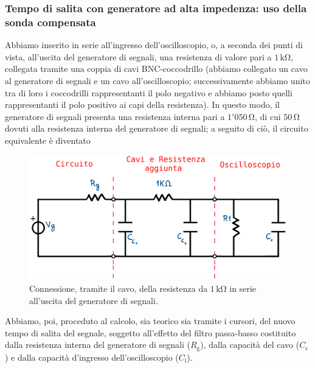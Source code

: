 \documentclass{article}
\begin{document}
			\subsubsection{Tempo di salita con generatore ad alta impedenza: uso della sonda compensata}
				Abbiamo inserito in serie all'ingresso dell'oscilloscopio, o, a seconda dei punti di vista, all'uscita del generatore di segnali, una resistenza di valore pari a $ 1 \, \mathrm{k\Omega} $, collegata tramite una coppia di cavi BNC-coccodrillo (abbiamo collegato un cavo al generatore di segnali e un cavo all'oscilloscopio; successivamente abbiamo unito tra di loro i coccodrilli rappresentanti il polo negativo e abbiamo posto quelli rappresentanti il polo positivo ai capi della resistenza). In questo modo, il generatore di segnali presenta una resistenza interna pari a $ 1'050 \, \mathrm{\Omega} $, di cui $ 50 \, \mathrm{\Omega} $ dovuti alla resistenza interna del generatore di segnali; a seguito di ciò, il circuito equivalente è diventato
				\begin{figure}[h!]
					\centering
					\includegraphics[scale=0.5]{circuitoResistenzaSerieCavo}
					\caption{Connessione, tramite il cavo, della resistenza da $ 1 \, \mathrm{k\Omega} $ in serie all'uscita del generatore di segnali.}
					\label{fig:circuitoResistenzaSerieCavo}
				\end{figure}
				\newpage
				Abbiamo, poi, proceduto al calcolo, sia teorico sia tramite i cursori, del nuovo tempo di salita del segnale, soggetto all'effetto del filtro passa-basso costituito dalla resistenza interna del generatore di segnali ($ R_{\mathrm{g}} $), dalla capacità del cavo ($ C_{\mathrm{c}} $) e dalla capacità d'ingresso dell'oscilloscopio ($ C_{\mathrm{i}} $).
\end{document}
